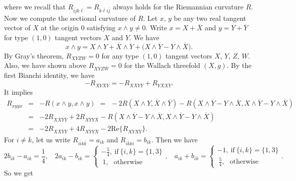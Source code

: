 \documentclass{amsart}
\numberwithin{equation}{section}
\theoremstyle{definition}
\renewcommand{\1}{\mathds{1}}
\renewcommand{\>}{\rightarrow}
\begin{document}
where we recall that $R_{i\overline{j}k\overline{\ell}}=R_{k\overline{\ell}i\overline{j}}$ always holds for the Riemannian curvature $R$.
Now we compute the sectional curvature of $R$. Let $x$, $y$ be any two real tangent vector of $X$ at the origin $0$ satisfying $x\wedge y\neq 0$. Write $x=X+\overline{X}$ and $y=Y+\overline{Y}$ for type $(1,0)$ tangent vectors $X$ and $Y$.  We have
$$ x\wedge y = X\wedge Y + \overline{X} \wedge \overline{Y} + \big( X\wedge \overline{Y} - Y \wedge \overline{X} \big). $$
By Gray's theorem, $R_{XYZW}=0$ for any type $(1,0)$ tangent vectors $X$, $Y$, $Z$, $W$. Also, we have shown above $R_{XYZ\overline{W}}=0$
for the Wallach threefold $(X,g)$. By the first Bianchi identity, we have
$$ - R_{XY\overline{X}\overline{Y}} = - R_{X\overline{X}Y\overline{Y}} + R_{Y\overline{X}X\overline{Y}}. $$
It implies
\begin{eqnarray*}
 R_{xyyx} & = &  - R (x\wedge y, x\wedge y) \ \, = \ \,  -2 R(X\wedge Y, \overline{X} \wedge \overline{Y} ) - R( X\wedge \overline{Y} - Y \wedge \overline{X} , X\wedge \overline{Y} - Y \wedge \overline{X}) \\
 & = & -2 R_{X\overline{X}Y\overline{Y}} + 2 R_{X\overline{Y}Y\overline{X}} - R( X\wedge \overline{Y} - Y \wedge \overline{X} , X\wedge \overline{Y} - Y \wedge \overline{X}) \\
 & = & -2 R_{X\overline{X}Y\overline{Y}} + 4 R_{X\overline{Y}Y\overline{X}} - 2\mbox{Re} \{ R_{X\overline{Y}X\overline{Y}} \}.
\end{eqnarray*}
For $i\neq k$, let us write $R_{i\overline{i}k\overline{k}}=a_{ik}$ and $R_{i\overline{k}k\overline{i}}=b_{ik}$.
Then we have
\begin{equation} \label{eq:8.29}
2 b_{ik} - a_{ik}= \frac{1}{4}, \ \ \  \ 2a_{ik}- b_{ik} = \left\{  \begin{array}{ll} -\frac{5}{4}, \ \mbox{if} \  \{i,k\} =\{ 1,3\}  \\ \ 1, \ \ \ \mbox{otherwise} \end{array}\!\!,\right.\ \ \ \
a_{ik}+ b_{ik} = \left\{  \begin{array}{ll} -1, \ \mbox{if} \  \{i,k\} =\{ 1,3\}  \\ \ \frac{5}{4}, \ \ \ \mbox{otherwise} \end{array}\!\!. \right.
\end{equation}
So we get
\end{document}

